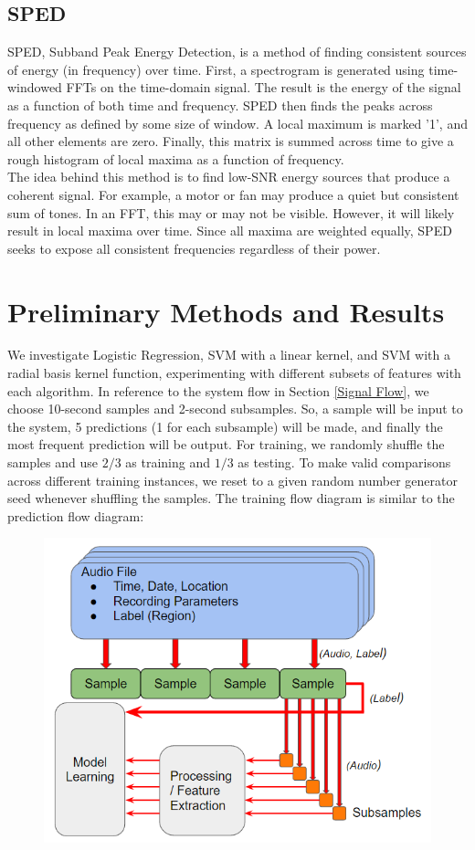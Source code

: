 \documentclass[journal]{IEEEtran}
\begin{document}
\subsection{SPED}
SPED, Subband Peak Energy Detection, is a method of finding consistent sources of energy (in frequency) over time. First, a spectrogram is generated using time-windowed FFTs on the time-domain signal. The result is the energy of the signal as a function of both time and frequency. SPED then finds the peaks across frequency as defined by some size of window. A local maximum is marked '1', and all other elements are zero. Finally, this matrix is summed across time to give a rough histogram of local maxima as a function of frequency. \\
The idea behind this method is to find low-SNR energy sources that produce a coherent signal. For example, a motor or fan may produce a quiet but consistent sum of tones. In an FFT, this may or may not be visible. However, it will likely result in local maxima over time. Since all maxima are weighted equally, SPED seeks to expose all consistent frequencies regardless of their power. 

\section{Preliminary Methods and Results}
We investigate Logistic Regression, SVM with a linear kernel, and SVM with a radial basis kernel function, experimenting with different subsets of features with each algorithm. In reference to the system flow in Section \ref{Signal Flow}, we choose 10-second samples and 2-second subsamples. So, a sample will be input to the system, 5 predictions (1 for each subsample) will be made, and finally the most frequent prediction will be output.  For training, we randomly shuffle the samples and use $2/3$ as training and $1/3$ as testing. To make valid comparisons across different training instances, we reset to a given random number generator seed whenever shuffling the samples. The training flow diagram is similar to the prediction flow diagram:
\begin{figure}[H]
\centering
\includegraphics[width=0.9\linewidth]{train_flow}
\end{figure}
\end{document}
